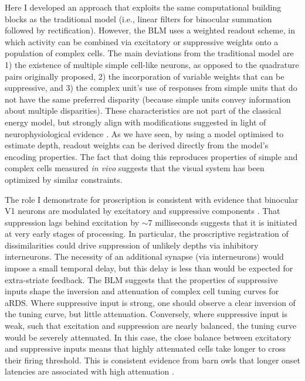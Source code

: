 Here I developed an approach that exploits the same computational building blocks as the traditional model (i.e., linear filters for binocular summation followed by rectification). However, the BLM uses a weighted readout scheme, in which activity can be combined via excitatory or suppressive weights onto a population of complex cells. The main deviations from the traditional model are 1) the existence of multiple simple cell-like neurons, as opposed to the quadrature pairs originally proposed, 2) the incorporation of variable weights that can be suppressive, and 3) the complex unit's use of responses from simple units that do not have the same preferred disparity (because simple units convey information about multiple disparities). These characteristics are not part of the classical energy model, but strongly align with modifications suggested in light of neurophysiological evidence \cite{Haefner:2008jg, Sasaki:2010pi, Tanabe:2011pt, Tanabe:2014ud, Baba:2015ij}. As we have seen, by using a model optimised to estimate depth, readout weights can be derived directly from the model's encoding properties. The fact that doing this reproduces properties of simple and complex cells measured {\it in vivo} suggests that the visual system has been optimized by similar constraints. 

The role I demonstrate for proscription is consistent with evidence that binocular V1 neurons are modulated by excitatory and suppressive components \cite{Tanabe:2011pt}. That suppression lags behind excitation by $\sim$7 milliseconds \cite{Tanabe:2014ud} suggests that it is initiated at very early stages of processing. In particular, the proscriptive registration of dissimilarities could drive suppression of unlikely depths via inhibitory interneurons. The necessity of an additional synapse (via interneurons) would impose a small temporal delay, but this delay is less than would be expected for extra-striate feedback. The BLM suggests that the properties of suppressive inputs shape the inversion and attenuation of complex cell tuning curves for aRDS. Where suppressive input is strong, one should observe a clear inversion of the tuning curve, but little attenuation. Conversely, where suppressive input is weak, such that excitation and suppression are nearly balanced, the tuning curve would be severely attenuated. In this case, the close balance between excitatory and suppressive inputs means that highly attenuated cells take longer to cross their firing threshold. This is consistent evidence from barn owls that longer onset latencies are associated with high attenuation \cite{Nieder:2001jl}. 

